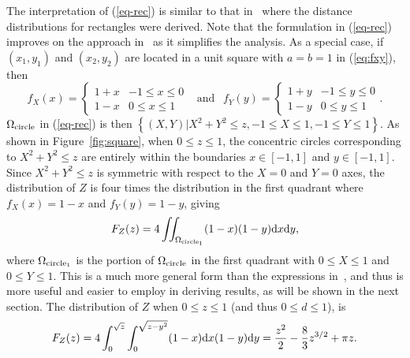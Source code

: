 \documentclass[12pt,draftclsnofoot,onecolumn]{IEEEtran}
\begin{document}
The interpretation of (\ref{eq-rec}) is similar to that in~\cite{ghosh1943distribution,
ghosh1943random} where the distance distributions for rectangles were derived.
Note that the formulation in (\ref{eq-rec}) improves on the approach
in~\cite{zhuang2011random, zhuang2012geometrical} as it simplifies the analysis.
As a special case, if $(x_1, y_1)$ and $(x_2, y_2)$ are located
in a unit square with $a=b=1$ in (\ref{eq:fxy}), then
\begin{equation}\label{eq:fxy-sqr}
  f_X(x)=\left\{
    \begin{array}{lr}
      1+x & -1\leq x \leq 0 \\
      1-x & 0 \leq x \leq 1
    \end{array}
  \right.
  ~~\mbox{ and }~~ f_Y(y)=\left\{
    \begin{array}{lr}
      1+y & -1\leq y \leq 0 \\
      1-y & 0 \leq y \leq 1
    \end{array}
  \right..
\end{equation}
$\Omega_{\rm circle}$ in (\ref{eq-rec}) is then $\left\{(X,Y)|X^2+Y^2\leq z, -1 \leq X \leq 1, -1 \leq Y \leq 1\right\}$.
As shown in Figure~\ref{fig:square}, when $0\leq z\leq1$, the concentric circles corresponding to
$X^2+Y^2\leq z$ are entirely within the boundaries $x \in {[-1,1]}$ and $y \in {[-1,1]}$.
Since $X^2+Y^2\leq z$ is symmetric with respect to the $X=0$ and $Y=0$ axes, the
distribution of $Z$ is four times the distribution in the first quadrant where
$f_X(x)=1-x$ and $f_Y(y)=1-y$, giving
\begin{equation}\label{eq:f_z1}
F_Z(z)=4\iint_{\Omega_{\rm circle_1}}(1-x)(1-y){\rm d}x{\rm d}y,
\end{equation}
where $\Omega_{\rm circle_1}$ is the portion of $\Omega_{\rm circle}$ in
the first quadrant with $0 \leq X \leq 1$ and $0 \leq Y \leq 1$.
This is a much more general form than the expressions in~\cite{zhuang2011random,
zhuang2012geometrical}, and thus is more useful and easier to employ in deriving results, as will be shown in the next section.
The distribution of $Z$ when $0\leq z\leq1$ (and thus $0\leq d\leq1$), is
\begin{equation}
F_Z(z)=4\int_0^{\sqrt{z}}\int_0^{\sqrt{z-y^2}}(1-x){\rm d}x(1-y){\rm d}y
=\frac{z^2}{2}-\frac{8}{3}z^{3/2}+\pi z. \nonumber
\end{equation}
\end{document}
